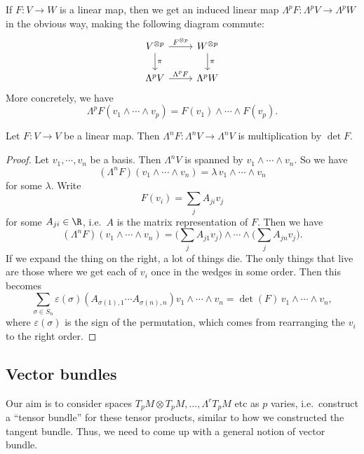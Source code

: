 \documentclass[a4paper]{article}
\begin{document}
If $F: V \to W$ is a linear map, then we get an induced linear map $\Lambda^p F: \Lambda^p V \to \Lambda^p W$ in the obvious way, making the following diagram commute:
\[
  \begin{tikzcd}
    V^{\otimes p} \ar[r, "F^{\otimes p}"] \ar[d, "\pi"] & W^{\otimes p} \ar[d, "\pi"]\\
    \Lambda^p V \ar[r, "\Lambda^p F"] & \Lambda^p W
  \end{tikzcd}
\]
More concretely, we have
\[
  \Lambda^p F (v_1 \wedge \cdots \wedge v_p) = F(v_1) \wedge \cdots \wedge F(v_p).
\]
\begin{lemma}
  Let $F: V \to V$ be a linear map. Then $\Lambda^n F: \Lambda^n V \to \Lambda^n V$ is multiplication by $\det F$.
\end{lemma}

\begin{proof}
  Let $v_1, \cdots, v_n$ be a basis. Then $\Lambda^n V$ is spanned by $v_1 \wedge \cdots \wedge v_n$. So we have
  \[
    (\Lambda^n F)(v_1\wedge \cdots \wedge v_n) = \lambda \, v_1 \wedge \cdots \wedge v_n
  \]
  for some $\lambda$. Write
  \[
    F(v_i) = \sum_j A_{ji} v_j
  \]
  for some $A_{ji} \in \R$, i.e.\ $A$ is the matrix representation of $F$. Then we have
  \[
    (\Lambda^n F)(v_1 \wedge \cdots \wedge v_n) = \biggl(\sum_j A_{j1} v_j\biggr) \wedge \cdots \wedge \biggl(\sum_j A_{jn} v_j\biggr).
  \]
  If we expand the thing on the right, a lot of things die. The only things that live are those where we get each of $v_i$ once in the wedges in some order. Then this becomes
  \[
    \sum_{\sigma \in S_n} \varepsilon(\sigma) (A_{\sigma(1), 1} \cdots A_{\sigma(n), n}) v_1 \wedge \cdots \wedge v_n = \det(F) \, v_1 \wedge \cdots \wedge v_n,
  \]
  where $\varepsilon(\sigma)$ is the sign of the permutation, which comes from rearranging the $v_i$ to the right order.
\end{proof}

\subsection{Vector bundles}
Our aim is to consider spaces $T_p M \otimes T_p M, \ldots, \Lambda^r T_p M$ etc as $p$ varies, i.e.\ construct a ``tensor bundle'' for these tensor products, similar to how we constructed the tangent bundle. Thus, we need to come up with a general notion of vector bundle.
\end{document}
